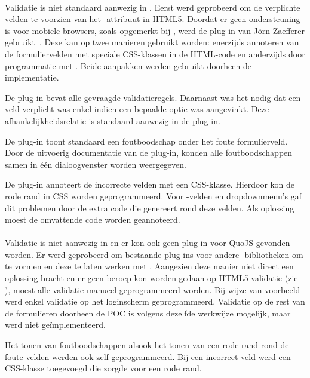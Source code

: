 \paragraph{\jqm}
Validatie is niet standaard aanwezig in \jqm. 
Eerst werd geprobeerd om de verplichte velden te voorzien van het -attribuut in HTML5. 
Doordat er geen ondersteuning is voor mobiele browsers, zoals opgemerkt bij \kendo{}, werd de plug-in van Jörn Zaefferer gebruikt~\cite{Zaefferer2013}. 
Deze kan op twee manieren gebruikt worden: enerzijds annoteren van de formuliervelden met speciale CSS-klassen in de HTML-code en anderzijds door programmatie met \js{}. 
Beide aanpakken werden gebruikt doorheen de implementatie. 

De plug-in bevat alle gevraagde validatieregels.
Daarnaast was het nodig dat een veld verplicht was enkel indien een bepaalde optie was aangevinkt.
Deze afhankelijkheidsrelatie is standaard aanwezig in de plug-in.

De plug-in toont standaard een foutboodschap onder het foute formulierveld.
Door de uitvoerig documentatie van de plug-in, konden alle foutboodschappen samen in één dialoogvenster worden weergegeven.

De plug-in annoteert de incorrecte velden met een CSS-klasse.
Hierdoor kon de rode rand in CSS worden geprogrammeerd. 
Voor -velden en dropdownmenu's gaf dit problemen door de extra code die \jqm{} genereert rond deze velden.
Als oplossing moest de omvattende code worden geannoteerd.

\paragraph{\lungo}
Validatie is niet aanwezig in \lungo{} en er kon ook geen plug-in voor QuoJS gevonden worden.
Er werd geprobeerd om bestaande plug-ins voor andere \js{}-bibliotheken om te vormen en deze te laten werken met \quo{}.
Aangezien deze manier niet direct een oplossing bracht en er geen beroep kon worden gedaan op HTML5-validatie (zie \kendo{}), moest alle validatie manueel geprogrammeerd worden. 
Bij wijze van voorbeeld werd enkel validatie op het loginscherm geprogrammeerd.
Validatie op de rest van de formulieren doorheen de POC is volgens dezelfde werkwijze mogelijk, maar werd niet geïmplementeerd.

Het tonen van foutboodschappen alsook het tonen van een rode rand rond de foute velden werden ook zelf geprogrammeerd.
Bij een incorrect veld werd een CSS-klasse toegevoegd die zorgde voor een rode rand.

